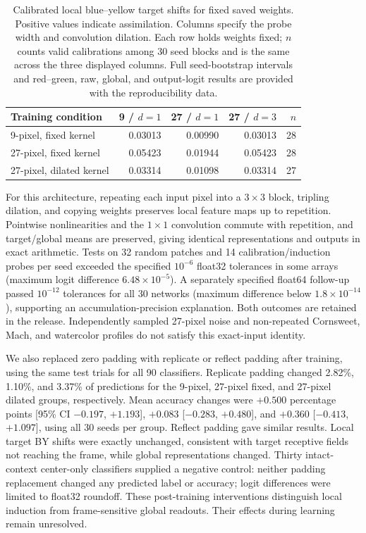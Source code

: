 \begin{table}[htbp]
\centering
\caption{Calibrated local blue--yellow target shifts for fixed saved weights. Positive values indicate assimilation. Columns specify the probe width and convolution dilation. Each row holds weights fixed; $n$ counts valid calibrations among 30 seed blocks and is the same across the three displayed columns. Full seed-bootstrap intervals and red--green, raw, global, and output-logit results are provided with the reproducibility data.}
\label{tab:frozen_scale}
\begin{tabular}{lrrrr}
\hline
Training condition & 9 / $d=1$ & 27 / $d=1$ & 27 / $d=3$ & $n$ \\
\hline
9-pixel, fixed kernel & 0.03013 & 0.00990 & 0.03013 & 28 \\
27-pixel, fixed kernel & 0.05423 & 0.01944 & 0.05423 & 28 \\
27-pixel, dilated kernel & 0.03314 & 0.01098 & 0.03314 & 27 \\
\hline
\end{tabular}
\end{table}

For this architecture, repeating each input pixel into a $3\times3$ block, tripling dilation, and copying weights preserves local feature maps up to repetition. Pointwise nonlinearities and the $1\times1$ convolution commute with repetition, and target/global means are preserved, giving identical representations and outputs in exact arithmetic. Tests on 32 random patches and 14 calibration/induction probes per seed exceeded the specified $10^{-6}$ float32 tolerances in some arrays (maximum logit difference $6.48\times10^{-5}$). A separately specified float64 follow-up passed $10^{-12}$ tolerances for all 30 networks (maximum difference below $1.8\times10^{-14}$), supporting an accumulation-precision explanation. Both outcomes are retained in the release. Independently sampled 27-pixel noise and non-repeated Cornsweet, Mach, and watercolor profiles do not satisfy this exact-input identity.

We also replaced zero padding with replicate or reflect padding after training, using the same test trials for all 90 classifiers. Replicate padding changed 2.82\%, 1.10\%, and 3.37\% of predictions for the 9-pixel, 27-pixel fixed, and 27-pixel dilated groups, respectively. Mean accuracy changes were $+0.500$ percentage points [95\% CI $-0.197$, $+1.193$], $+0.083$ [$-0.283$, $+0.480$], and $+0.360$ [$-0.413$, $+1.097$], using all 30 seeds per group. Reflect padding gave similar results. Local target BY shifts were exactly unchanged, consistent with target receptive fields not reaching the frame, while global representations changed. Thirty intact-context center-only classifiers supplied a negative control: neither padding replacement changed any predicted label or accuracy; logit differences were limited to float32 roundoff. These post-training interventions distinguish local induction from frame-sensitive global readouts. Their effects during learning remain unresolved.

